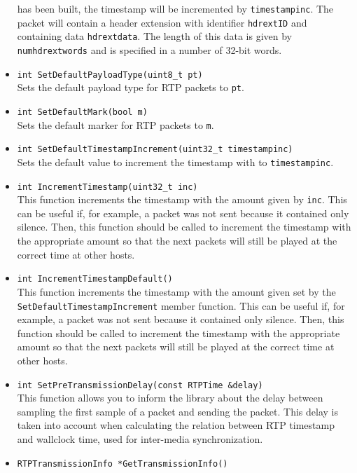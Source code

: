 \documentclass[12pt,a4paper]{article}
\begin{document}
\begin{itemize}
						has been built, the timestamp will be incremented by {\tt timestampinc}.
						The packet will contain a header extension with identifier {\tt hdrextID} and
						containing data {\tt hdrextdata}. The length of this data is given by
						{\tt numhdrextwords} and is specified in a number of 32-bit words.
					\item {\tt int SetDefaultPayloadType(uint8\_t pt)}\\
						Sets the default payload type for RTP packets to {\tt pt}.
					\item {\tt int SetDefaultMark(bool m)}\\
						Sets the default marker for RTP packets to {\tt m}.
					\item {\tt int SetDefaultTimestampIncrement(uint32\_t timestampinc)}\\
						Sets the default value to increment the timestamp with to
						{\tt timestampinc}.
					\item {\tt int IncrementTimestamp(uint32\_t inc)}\\
						This function increments the timestamp with the amount
						given by {\tt inc}. This can be useful if, for example,
						a packet was not sent because it contained only silence.
						Then, this function should be called to increment the
						timestamp with the appropriate amount so that the next
						packets will still be played at the correct time at
						other hosts.
					\item {\tt int IncrementTimestampDefault()}\\
						This function increments the timestamp with the amount
						given set by the {\tt SetDefaultTimestampIncrement}
						member function. This can be useful if, for example,
						a packet was not sent because it contained only silence.
						Then, this function should be called to increment the
						timestamp with the appropriate amount so that the next
						packets will still be played at the correct time at
						other hosts.						
					\item {\tt int SetPreTransmissionDelay(const RTPTime \&delay)}\\
						This function allows you to inform the library about the
						delay between sampling the first sample of a packet and
						sending the packet. This delay is taken into account when
						calculating the relation between RTP timestamp and wallclock
						time, used for inter-media synchronization.
					\item {\tt RTPTransmissionInfo *GetTransmissionInfo()}\\

\end{itemize}
\end{document}
